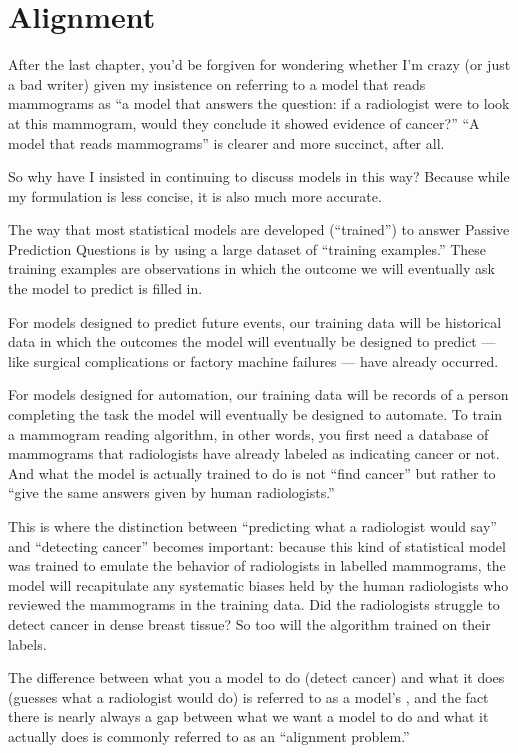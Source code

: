 \documentclass[letterpaper,10pt,english]{jupyterBook}
\begin{document}
\section{Alignment}
\label{\detokenize{30_questions/23_passive_internal_alignment_and_bias:alignment}}
\sphinxAtStartPar
After the last chapter, you’d be forgiven for wondering whether I’m crazy (or just a bad writer) given my insistence on referring to a model that reads mammograms as “a model that answers the question: if a radiologist were to look at this mammogram, would they conclude it showed evidence of cancer?” “A model that reads mammograms” is clearer and more succinct, after all.

\sphinxAtStartPar
So why have I insisted in continuing to discuss models in this way? Because while my formulation is less concise, it is also much more accurate.

\sphinxAtStartPar
The way that most statistical models are developed (“trained”) to answer Passive Prediction Questions is by using a large dataset of “training examples.” These training examples are observations in which the outcome we will eventually ask the model to predict is filled in.

\sphinxAtStartPar
For models designed to predict future events, our training data will be historical data in which the outcomes the model will eventually be designed to predict — like surgical complications or factory machine failures — have already occurred.

\sphinxAtStartPar
For models designed for automation, our training data will be records of a person completing the task the model will eventually be designed to automate. To train a mammogram reading algorithm, in other words, you first need a database of mammograms that radiologists have already labeled as indicating cancer or not. And what the model is actually trained to do is not “find cancer” but rather to “give the same answers given by human radiologists.”

\sphinxAtStartPar
This is where the distinction between “predicting what a radiologist would say” and “detecting cancer” becomes important: because this kind of statistical model was trained to emulate the behavior of radiologists in labelled mammograms, the model will recapitulate any systematic biases held by the human radiologists who reviewed the mammograms in the training data. Did the radiologists struggle to detect cancer in dense breast tissue? So too will the algorithm trained on their labels.

\sphinxAtStartPar
The difference between what you  a model to do (detect cancer) and what it  does (guesses what a radiologist would do) is referred to as a model’s , and the fact there is nearly always a gap between what we want a model to do and what it actually does is commonly referred to as an “alignment problem.”
\end{document}
